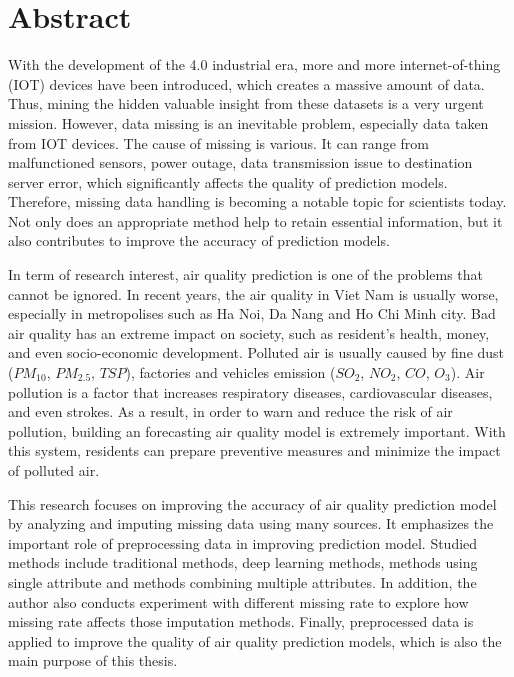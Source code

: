 \chapter*{Abstract}
With the development of the 4.0 industrial era, more and more internet-of-thing (IOT) devices have been introduced, which creates a massive amount of data. Thus, mining the hidden valuable insight from these datasets is a very urgent mission. However, data missing is an inevitable problem, especially data taken from IOT devices. The cause of missing is various. It can range from malfunctioned sensors, power outage, data transmission issue to destination server error, which significantly affects the quality of prediction models. Therefore, missing data handling is becoming a notable topic for scientists today. Not only does an appropriate method help to retain essential information, but it also contributes to improve the accuracy of prediction models.

In term of research interest, air quality prediction is one of the problems that cannot be ignored. In recent years, the air quality in Viet Nam is usually worse, especially in metropolises such as Ha Noi, Da Nang and Ho Chi Minh city. Bad air quality has an extreme impact on society, such as resident's health, money, and even socio-economic development. Polluted air is usually caused by fine dust ($PM_{10}$, $PM_{2.5}$, $TSP$), factories and vehicles emission ($SO_2$, $NO_2$, $CO$, $O_3$). Air pollution is a factor that increases respiratory diseases, cardiovascular diseases, and even strokes. As a result, in order to warn and reduce the risk of air pollution, building an forecasting air quality model is extremely important. With this system, residents can prepare preventive measures and minimize the impact of polluted air.

This research focuses on improving the accuracy of air quality prediction model by analyzing and imputing missing data using many sources. It emphasizes the important role of preprocessing data in improving prediction model. Studied methods include traditional methods, deep learning methods, methods using single attribute and methods combining multiple attributes. In addition, the author also conducts experiment with different missing rate to explore how missing rate affects those imputation methods. Finally, preprocessed data is applied to improve the quality of air quality prediction models, which is also the main purpose of this thesis.